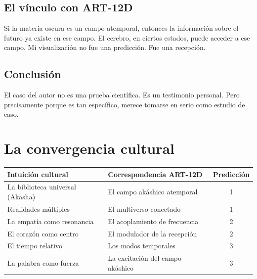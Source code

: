 \subsection{El vínculo con ART-12D}
Si la materia oscura es un campo atemporal, entonces la información sobre el futuro ya existe en ese campo. El cerebro, en ciertos estados, puede acceder a ese campo. Mi visualización no fue una predicción. Fue una recepción.

\subsection{Conclusión}
El caso del autor no es una prueba científica. Es un testimonio personal. Pero precisamente porque es tan específico, merece tomarse en serio como estudio de caso.

\section{La convergencia cultural}
\begin{table}[H]
\centering
\begin{tabular}{@{}llc@{}}
\toprule
\textbf{Intuición cultural} & \textbf{Correspondencia ART-12D} & \textbf{Predicción} \\ \midrule
La biblioteca universal (Akasha) & El campo akáshico atemporal & 1 \\
Realidades múltiples & El multiverso conectado & 1 \\
La empatía como resonancia & El acoplamiento de frecuencia & 2 \\
El corazón como centro & El modulador de la recepción & 2 \\
El tiempo relativo & Los modos temporales & 3 \\
La palabra como fuerza & La excitación del campo akáshico & 3 \\ \bottomrule
\end{tabular}
\end{table}

\newpage
